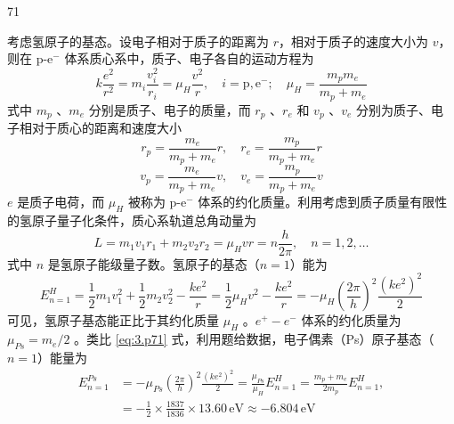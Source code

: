 \begin{solution}{71}
    \begin{subsolution}
        考虑氢原子的基态。设电子相对于质子的距离为 $r$，相对于质子的速度大小为 $v$，则在 p-e$^{-}$ 体系质心系中，质子、电子各自的运动方程为
        \begin{equation}
            k\frac{e^{2}}{r^{2}} = m_{i}\frac{v_{i}^{2}}{r_{i}} = \mu_{H}\frac{v^{2}}{r},\quad i = \mathrm{p}, \mathrm{e}^{-};\quad \mu_{H} = \frac{m_{p} m_{e}}{m_{p} + m_{e}} \label{eq:1.p71}
        \end{equation}
        式中 $m_{p}$ 、$m_{e}$ 分别是质子、电子的质量，而 $r_{p}$ 、$r_{e}$ 和 $v_{p}$ 、$v_{e}$ 分别为质子、电子相对于质心的距离和速度大小
        \begin{equation*}
            r_{p} = \frac{m_{e}}{m_{p} + m_{e}} r,\quad r_{e} = \frac{m_{p}}{m_{p} + m_{e}} r
        \end{equation*}
        \begin{equation*}
            v_{p} = \frac{m_{e}}{m_{p} + m_{e}} v,\quad v_{e} = \frac{m_{p}}{m_{p} + m_{e}} v
        \end{equation*}
        $e$ 是质子电荷，而 $\mu_{H}$ 被称为 p-e$^{-}$ 体系的约化质量。利用考虑到质子质量有限性的氢原子量子化条件，质心系轨道总角动量为
        \begin{equation}
            L = m_{1} v_{1} r_{1} + m_{2} v_{2} r_{2} = \mu_{H} v r = n\frac{h}{2\pi},\quad n = 1,2,\dots \label{eq:2.p71}
        \end{equation}
        式中 $n$ 是氢原子能级量子数。氢原子的基态（$n=1$）能为
        \begin{equation}
            E_{n=1}^{H} = \frac{1}{2}m_{1}v_{1}^{2} + \frac{1}{2}m_{2}v_{2}^{2} - \frac{k e^{2}}{r} = \frac{1}{2}\mu_{H} v^{2} - \frac{k e^{2}}{r} = -\mu_{H}\left(\frac{2\pi}{h}\right)^{2}\frac{(k e^{2})^{2}}{2} \label{eq:3.p71}
        \end{equation}
        可见，氢原子基态能正比于其约化质量 $\mu_{H}$ 。$e^{+}-e^{-}$ 体系的约化质量为 $\mu_{Ps}=m_{e}/2$ 。类比 \eqref{eq:3.p71} 式，利用题给数据，电子偶素（Ps）原子基态（$n=1$）能量为
        \begin{align}
            E_{n=1}^{Ps} &= -\mu_{Ps}\left(\frac{2\pi}{h}\right)^{2}\frac{(k e^{2})^{2}}{2} = \frac{\mu_{Ps}}{\mu_{H}} E_{n=1}^{H} = \frac{m_{p} + m_{e}}{2m_{p}} E_{n=1}^{H}, \nonumber \\
            &= -\frac{1}{2} \times \frac{1837}{1836} \times 13.60\,\mathrm{eV} \approx -6.804\,\mathrm{eV} \label{eq:4.p71}
        \end{align}

\end{subsolution}
\end{solution}
